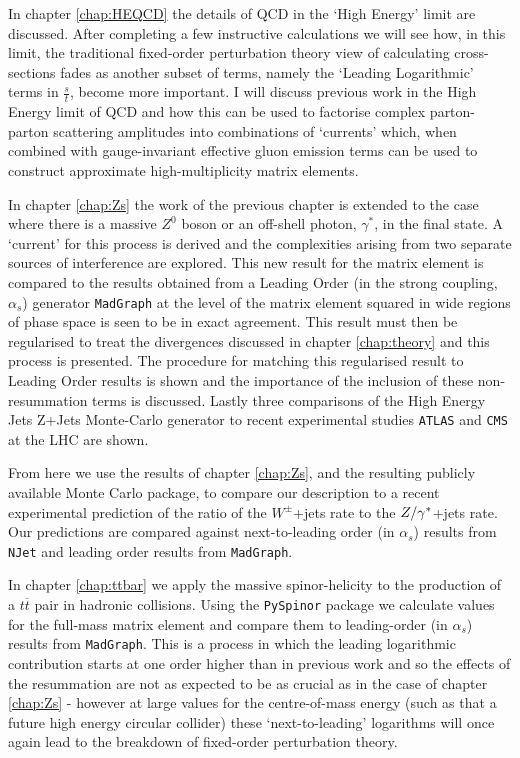 	In chapter \ref{chap:HEQCD} the details of QCD in the `High Energy' limit are discussed.  After completing a
	few instructive calculations we will see how, in this limit, the traditional fixed-order perturbation theory
	view of calculating cross-sections fades as another subset of terms, namely the `Leading Logarithmic' terms in
	$\frac{s}{t}$, become more important.  I will discuss previous work in the High Energy limit of QCD and how
	this can be used to factorise complex parton-parton scattering amplitudes into combinations of `currents' which,
	when combined with gauge-invariant effective gluon emission terms can be used to construct approximate
	high-multiplicity matrix elements.

	In chapter \ref{chap:Zs} the work of the previous chapter is extended to the case where there is a massive
	$Z^0$ boson or an off-shell photon, $\gamma^*$, in the final state.  A `current' for this process is derived
	and the complexities arising from two separate sources of interference are explored.  This new result for the
	matrix element is compared to the results obtained from a Leading Order (in the strong coupling, $\alpha_s$)
	generator \texttt{MadGraph} at the level of the matrix element squared in wide regions of phase space is seen
	to be in exact agreement. This result must then be regularised to treat the divergences discussed in chapter
	\ref{chap:theory} and this process is presented.  The procedure for matching this regularised result to Leading
	Order results is shown and the importance of the inclusion of these non-resummation terms is discussed. Lastly
	three comparisons of the High Energy Jets Z+Jets Monte-Carlo generator to recent experimental studies
	\texttt{ATLAS} and \texttt{CMS} at the LHC are shown.

	From here we use the results of chapter \ref{chap:Zs}, and the resulting publicly available Monte Carlo package,
	to compare our description to a recent experimental prediction of the ratio of the $W^\pm$+jets rate to the
	$Z/\gamma^*$+jets rate.  Our predictions are compared against next-to-leading order (in $\alpha_s$) results from
	\texttt{NJet} and leading order results from \texttt{MadGraph}.

	In chapter \ref{chap:ttbar} we apply the massive spinor-helicity to the production of a $t\overline t$ pair
	in hadronic collisions.  Using the \texttt{PySpinor} package we calculate values for the full-mass matrix
	element and compare them to leading-order (in $\alpha_s$) results from \texttt{MadGraph}.  This is a process
	in which the leading logarithmic contribution starts at one order higher than in previous work and so the effects
	of the resummation are not as expected to be as crucial as in the case of chapter \ref{chap:Zs} - however at
	large values for the centre-of-mass energy (such as that a future high energy circular collider) these
	`next-to-leading' logarithms will once again lead to the breakdown of fixed-order perturbation theory.

